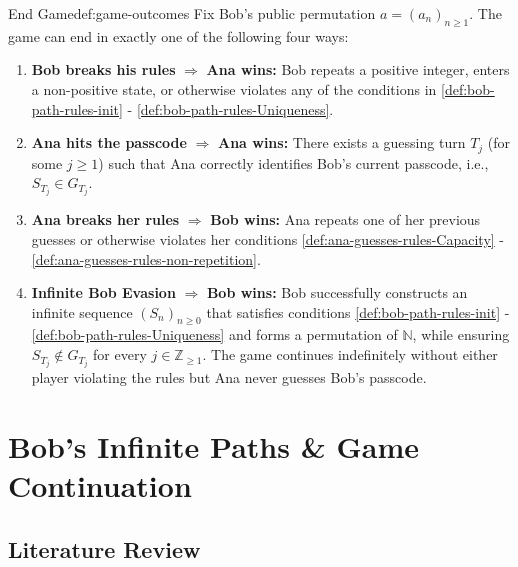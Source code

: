 \begin{definition}{End Game}{def:game-outcomes}
Fix Bob's public permutation $a = (a_n)_{n \ge 1}$. The game can end in exactly one of the following four ways: 

\begin{enumerate}[label=E\arabic*,ref=E\arabic*] 

\item \label{end:bob-breaks} \textbf{Bob breaks his rules} $\Longrightarrow$ \textbf{Ana wins:} Bob repeats a positive integer, enters a non-positive state, or otherwise violates any of the conditions in \ref{def:bob-path-rules-init} - \ref{def:bob-path-rules-Uniqueness}.

\item \label{end:ana-hits} \textbf{Ana hits the passcode} $\Longrightarrow$ \textbf{Ana wins:} There exists a guessing turn $T_j$ (for some $j \ge 1$) such that Ana correctly identifies Bob's current passcode, i.e., $S_{T_j} \in G_{T_j}$. 

\item \label{end:ana-breaks} \textbf{Ana breaks her rules} $\Longrightarrow$ \textbf{Bob wins:} Ana repeats one of her previous guesses or otherwise violates her conditions \ref{def:ana-guesses-rules-Capacity} - \ref{def:ana-guesses-rules-non-repetition}.

\item \label{end:infinite-play} \textbf{Infinite Bob Evasion} $ \Longrightarrow $  \textbf{Bob wins:} Bob successfully constructs an infinite sequence $(S_n)_{n \ge 0}$ that satisfies conditions \ref{def:bob-path-rules-init} - \ref{def:bob-path-rules-Uniqueness} and forms a permutation of $\mathbb{N}$, while ensuring $S_{T_j} \notin G_{T_j}$ for every $j \in \mathbb{Z}_{\ge 1}$. The game continues indefinitely without either player violating the rules but Ana never guesses Bob's passcode. 
\end{enumerate}
\end{definition}

\section{Bob's Infinite Paths \& Game Continuation}

\subsection{Literature Review}

